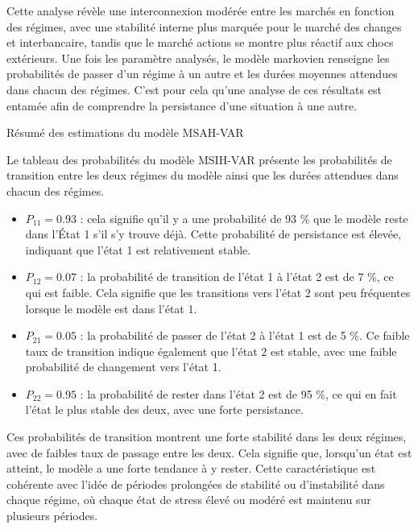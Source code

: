 Cette analyse révèle une interconnexion modérée entre les marchés en fonction des régimes, avec une stabilité interne plus marquée pour le marché des changes et interbancaire, tandis que le marché actions se montre plus réactif aux chocs extérieurs. Une fois les paramètre analysés, le modèle markovien renseigne les probabilités de passer d'un régime à un autre et les durées moyennes attendues dans chacun des régimes. C'est pour cela qu'une analyse de ces résultats est entamée afin de comprendre la persistance d'une situation à une autre.

\begin{table}[H]
    \centering
    \caption{Résumé des estimations du modèle MSAH-VAR}
    \sffamily
    
    \label{tab:comparaison2}
\end{table}

Le tableau des probabilités du modèle MSIH-VAR présente les probabilités de transition entre les deux régimes du modèle ainsi que les durées attendues dans chacun des régimes. 

\vspace{0.5cm}

\begin{itemize}
    \item \textit{\( P_{11} = 0.93 \)} : cela signifie qu'il y a une probabilité de 93 \% que le modèle reste dans l'État 1 s'il s'y trouve déjà. Cette probabilité de persistance est élevée, indiquant que l'état 1 est relativement stable.
    \item \textit{\( P_{12} = 0.07 \)} : la probabilité de transition de l'état 1 à l'état 2 est de 7 \%, ce qui est faible. Cela signifie que les transitions vers l'état 2 sont peu fréquentes lorsque le modèle est dans l'état 1.
    \item \textit{\( P_{21} = 0.05 \)} : la probabilité de passer de l'état 2 à l'état 1 est de 5 \%. Ce faible taux de transition indique également que l'état 2 est stable, avec une faible probabilité de changement vers l'état 1.
    \item \textit{\( P_{22} = 0.95 \)} : la probabilité de rester dans l'état 2 est de 95 \%, ce qui en fait l'état le plus stable des deux, avec une forte persistance.
\end{itemize}

Ces probabilités de transition montrent une forte stabilité dans les deux régimes, avec de faibles taux de passage entre les deux. Cela signifie que, lorsqu’un état est atteint, le modèle a une forte tendance à y rester. Cette caractéristique est cohérente avec l’idée de périodes prolongées de stabilité ou d'instabilité dans chaque régime, où chaque état de stress élevé ou modéré est maintenu sur plusieurs périodes.

